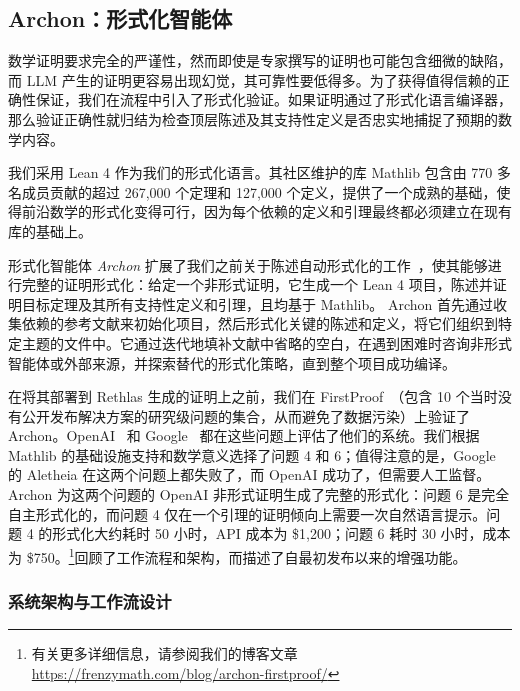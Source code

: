 \subsection{Archon：形式化智能体}\label{subsec:archon}

数学证明要求完全的严谨性，然而即使是专家撰写的证明也可能包含细微的缺陷，而 LLM 产生的证明更容易出现幻觉，其可靠性要低得多。为了获得值得信赖的正确性保证，我们在流程中引入了形式化验证。如果证明通过了形式化语言编译器，那么验证正确性就归结为检查顶层陈述及其支持性定义是否忠实地捕捉了预期的数学内容。

我们采用 Lean 4 作为我们的形式化语言。其社区维护的库 Mathlib 包含由 770 多名成员贡献的超过 267,000 个定理和 127,000 个定义，提供了一个成熟的基础，使得前沿数学的形式化变得可行，因为每个依赖的定义和引理最终都必须建立在现有库的基础上。

形式化智能体 \textit{Archon} 扩展了我们之前关于陈述自动形式化的工作~\cite{gao2024herald, wang2025aria}，使其能够进行完整的证明形式化：给定一个非形式证明，它生成一个 Lean 4 项目，陈述并证明目标定理及其所有支持性定义和引理，且均基于 Mathlib。
Archon 首先通过收集依赖的参考文献来初始化项目，然后形式化关键的陈述和定义，将它们组织到特定主题的文件中。它通过迭代地填补文献中省略的空白，在遇到困难时咨询非形式智能体或外部来源，并探索替代的形式化策略，直到整个项目成功编译。

在将其部署到 Rethlas 生成的证明上之前，我们在 FirstProof~\cite{abouzaid2026first}（包含 10 个当时没有公开发布解决方案的研究级问题的集合，从而避免了数据污染）上验证了 Archon。OpenAI~\cite{openai_first_proof_2026} 和 Google~\cite{feng2026aletheia} 都在这些问题上评估了他们的系统。我们根据 Mathlib 的基础设施支持和数学意义选择了问题 4 和 6；值得注意的是，Google 的 Aletheia 在这两个问题上都失败了，而 OpenAI 成功了，但需要人工监督。Archon 为这两个问题的 OpenAI 非形式证明生成了完整的形式化：问题 6 是完全自主形式化的，而问题 4 仅在一个引理的证明倾向上需要一次自然语言提示。问题 4 的形式化大约耗时 50 小时，API 成本为 \$1,200；问题 6 耗时 30 小时，成本为 \$750。\footnote{有关更多详细信息，请参阅我们的博客文章 \url{https://frenzymath.com/blog/archon-firstproof/}}回顾了工作流程和架构，而描述了自最初发布以来的增强功能。

\subsubsection{系统架构与工作流设计\label{subsubsec:workflow}}

